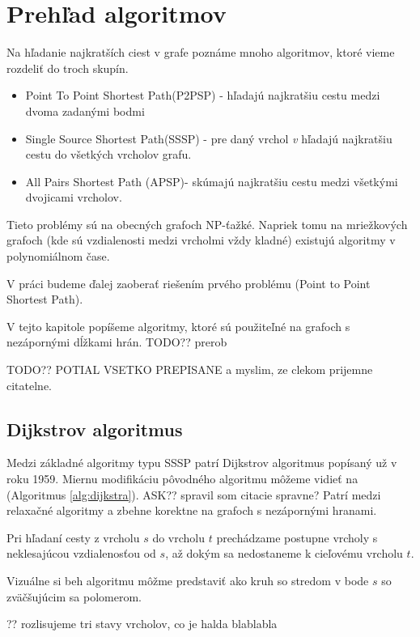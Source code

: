 \chapter{Prehľad algoritmov}
Na hľadanie najkratších ciest v grafe poznáme mnoho algoritmov, ktoré vieme rozdeliť do troch skupín.


\begin{itemize}
\item Point To Point Shortest Path(P2PSP) - hľadajú najkratšiu cestu medzi dvoma zadanými bodmi
\item Single Source Shortest Path(SSSP) - pre daný vrchol {\sl v} hľadajú najkratšiu cestu do všetkých vrcholov grafu.
\item All Pairs Shortest Path (APSP)- skúmajú najkratšiu cestu medzi všetkými dvojicami vrcholov.
\end{itemize}

Tieto problémy sú na obecných grafoch NP-ťažké.
Napriek tomu na mriežkových grafoch (kde sú vzdialenosti medzi vrcholmi vždy kladné) existujú algoritmy v polynomiálnom čase.

V práci budeme ďalej zaoberať riešením prvého problému (Point to Point Shortest Path). 

V tejto kapitole popíšeme algoritmy, ktoré sú použiteľné na grafoch s nezápornými dĺžkami hrán. TODO?? prerob

TODO?? POTIAL VSETKO PREPISANE a myslim, ze clekom prijemne citatelne.

\section{Dijkstrov algoritmus}
Medzi základné algoritmy typu SSSP patrí Dijkstrov algoritmus \cite{dijkstra59} popísaný už v roku 1959. 
Miernu modifikáciu pôvodného algoritmu môžeme vidieť na (Algoritmus \ref{alg:dijkstra}).  ASK?? spravil som citacie spravne?
Patrí medzi relaxačné algoritmy a zbehne korektne na grafoch
s nezápornými hranami.

Pri hľadaní cesty z vrcholu $s$ do vrcholu $t$ prechádzame postupne vrcholy s neklesajúcou vzdialenosťou od $s$, až dokým sa nedostaneme k cieľovému vrcholu $t$.



Vizuálne si beh algoritmu môžme predstaviť ako kruh so stredom v bode $s$ so zväčšujúcim sa polomerom.

?? rozlisujeme tri stavy vrcholov, co je halda blablabla


